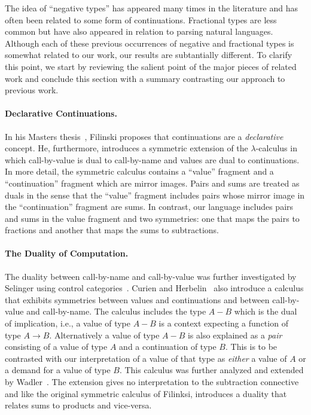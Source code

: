 \documentclass[preprint]{sigplanconf}
\begin{document}
The idea of ``negative types'' has appeared many times in the literature and
has often been related to some form of continuations. Fractional types are
less common but have also appeared in relation to parsing natural
languages. Although each of these previous occurrences of negative and
fractional types is somewhat related to our work, our results are
subtantially different. To clarify this point, we start by reviewing the
salient point of the major pieces of related work and conclude this section
with a summary contrasting our approach to previous work.

\paragraph*{Declarative Continuations.} 
In his Masters thesis~\cite{Filinski:1989:DCI:648332.755574}, Filinski
proposes that continuations are a \emph{declarative} concept. He,
furthermore, introduces a symmetric extension of the $\lambda$-calculus in
which call-by-value is dual to call-by-name and values are dual to
continuations. In more detail, the symmetric calculus contains a ``value''
fragment and a ``continuation'' fragment which are mirror images. Pairs and
sums are treated as duals in the sense that the ``value'' fragment includes
pairs whose mirror image in the ``continuation'' fragment are sums. In
contrast, our language includes pairs and sums in the value fragment and two
symmetries: one that maps the pairs to fractions and another that maps the
sums to subtractions.

\paragraph*{The Duality of Computation.}
The duality between call-by-name and call-by-value was further investigated
by Selinger using control
categories~\cite{Selinger:2001:CCD:966910.966911}. Curien and
Herbelin~\cite{Curien:2000} also introduce a calculus that exhibits
symmetries between values and continuations and between call-by-value and
call-by-name. The calculus includes the type $A-B$ which is the dual of
implication, i.e., a value of type $A-B$ is a context expecting a function of
type $A \rightarrow B$. Alternatively a value of type $A-B$ is also explained
as a \emph{pair} consisting of a value of type $A$ and a continuation of type
$B$. This is to be contrasted with our interpretation of a value of that type
as \emph{either} a value of $A$ or a demand for a value of type $B$. This
calculus was further analyzed and extended by
Wadler~\cite{Wadler:2003,DBLP:conf/rta/Wadler05}. The extension gives no
interpretation to the subtraction connective and like the original symmetric
calculus of Filinksi, introduces a duality that relates sums to products and
vice-versa.
\end{document}
